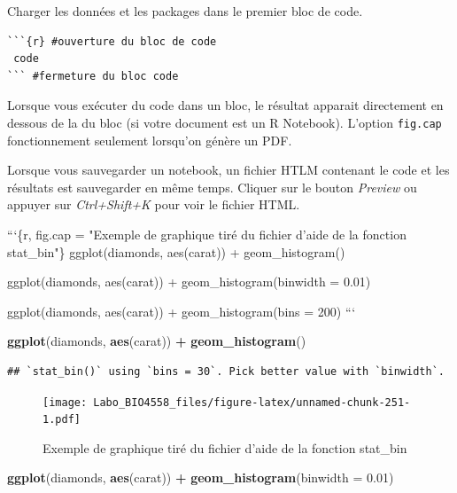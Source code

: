 \documentclass[12pt,]{book}
\newenvironment{Shaded}{\begin{snugshade}}{\end{snugshade}}
\newcommand{\BaseNTok}[1]{\textcolor[rgb]{0.06,0.06,0.06}{#1}}
\newcommand{\DataTypeTok}[1]{\textcolor[rgb]{0.27,0.27,0.27}{#1}}
\newcommand{\FloatTok}[1]{\textcolor[rgb]{0.06,0.06,0.06}{#1}}
\newcommand{\KeywordTok}[1]{\textcolor[rgb]{0.27,0.27,0.27}{\textbf{#1}}}
\newcommand{\NormalTok}[1]{#1}
\newcommand{\OperatorTok}[1]{\textcolor[rgb]{0.43,0.43,0.43}{\textbf{#1}}}
\newcommand{\StringTok}[1]{\textcolor[rgb]{0.5,0.5,0.5}{#1}}
\begin{document}
Charger les données et les packages dans le premier bloc de code.

\begin{verbatim}
```{r} #ouverture du bloc de code
 code
``` #fermeture du bloc code
\end{verbatim}

Lorsque vous exécuter du code dans un bloc, le résultat apparait directement en dessous de la du bloc (si votre document est un R Notebook).
L'option \texttt{fig.cap} fonctionnement seulement lorsqu'on génère un PDF.

Lorsque vous sauvegarder un notebook, un fichier HTLM contenant le code et les résultats est sauvegarder en même temps. Cliquer sur le bouton \emph{Preview} ou appuyer sur \emph{Ctrl+Shift+K} pour voir le fichier HTML.

\begin{Shaded}
\begin{Highlighting}[]
\BaseNTok{```\{r, fig.cap = "Exemple de graphique tiré du fichier d'aide de la fonction stat_bin"\}}
\BaseNTok{ggplot(diamonds, aes(carat)) +}
\BaseNTok{  geom_histogram()}

\BaseNTok{ggplot(diamonds, aes(carat)) +}
\BaseNTok{  geom_histogram(binwidth = 0.01)}

\BaseNTok{ggplot(diamonds, aes(carat)) +}
\BaseNTok{  geom_histogram(bins = 200)}
\BaseNTok{```}
\end{Highlighting}
\end{Shaded}

\begin{Shaded}
\begin{Highlighting}[]
\KeywordTok{ggplot}\NormalTok{(diamonds, }\KeywordTok{aes}\NormalTok{(carat)) }\OperatorTok{+}
\StringTok{  }\KeywordTok{geom_histogram}\NormalTok{()}
\end{Highlighting}
\end{Shaded}

\begin{verbatim}
## `stat_bin()` using `bins = 30`. Pick better value with `binwidth`.
\end{verbatim}

\begin{figure}
\centering
\texttt{[image: Labo\_BIO4558\_files/figure-latex/unnamed-chunk-251-1.pdf]}
\caption{\label{fig:unnamed-chunk-251-1}Exemple de graphique tiré du fichier d'aide de la fonction stat\_bin}
\end{figure}

\begin{Shaded}
\begin{Highlighting}[]
\KeywordTok{ggplot}\NormalTok{(diamonds, }\KeywordTok{aes}\NormalTok{(carat)) }\OperatorTok{+}
\StringTok{  }\KeywordTok{geom_histogram}\NormalTok{(}\DataTypeTok{binwidth =} \FloatTok{0.01}\NormalTok{)}
\end{Highlighting}
\end{Shaded}
\end{document}
